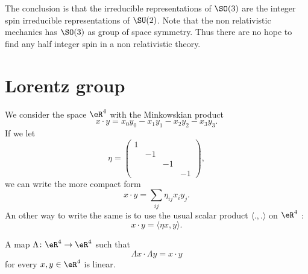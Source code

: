 \begin{normaltext}      \label{NORMooHWAYooPlSDOp}
    The conclusion is that the irreducible representations of $\SO(3)$ are the integer spin irreducible representations of $\SU(2)$. Note that the non relativistic mechanics has $\SO(3)$ as group of space symmetry. Thus there are no hope to find any half integer spin in a non relativistic theory.
\end{normaltext}

\section{Lorentz group}

We consider the space \( \eR^4\) with the Minkowskian product
\begin{equation}
    x\cdot y=x_0y_0-x_1y_1-x_2y_2-x_3y_3.
\end{equation}
If we let
\begin{equation}
    \eta=\begin{pmatrix}
         1   &       &       &       \\
            &   -1    &       &       \\
            &       &   -1    &       \\ 
            &       &       &   -1     
     \end{pmatrix},
\end{equation}
we can write the more compact form
\begin{equation}
    x\cdot y=\sum_{ij}\eta_{ij}x_iy_j.
\end{equation}
An other way to write the same is to use the usual scalar product \( \langle ., .\rangle \) on \( \eR^4\) :
\begin{equation}    \label{EQooQAXNooXhGUQV}
    x\cdot y=\langle \eta x, y\rangle .
\end{equation}

\begin{lemma}       \label{LEMooICEYooNcjJjD}
    A map \( \Lambda\colon \eR^4\to \eR^4\) such that
    \begin{equation}
        \Lambda x\cdot \Lambda y=x\cdot y
    \end{equation}
    for every \( x,y\in  \eR^4\) is linear.
\end{lemma}

